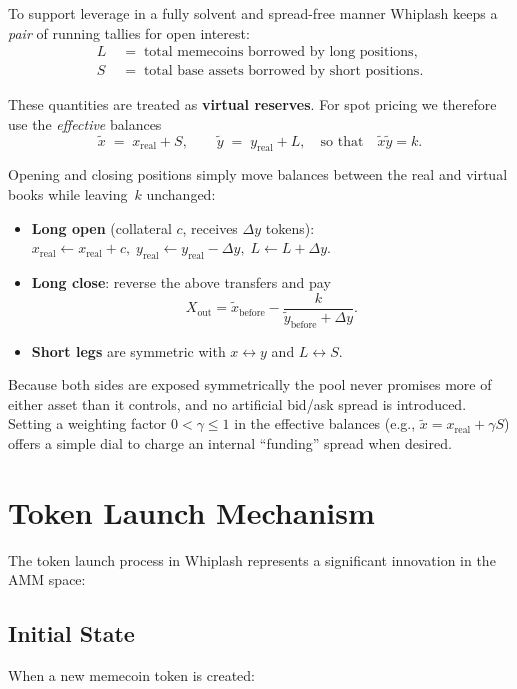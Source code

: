 \documentclass[11pt]{article}
\begin{document}
To support leverage in a fully solvent and spread-free manner Whiplash keeps a \emph{pair} of running tallies for open interest:
\begin{align}
L &\;=\; \text{total memecoins borrowed by long positions},\\
S &\;=\; \text{total base assets borrowed by short positions}.
\end{align}

These quantities are treated as \textbf{virtual reserves}.  For spot pricing we therefore use the \emph{effective} balances
\begin{equation}
\tilde x \;=\; x_{\text{real}} + S, \qquad
\tilde y \;=\; y_{\text{real}} + L ,
\quad\text{so that}\quad
\tilde x \tilde y = k.
\end{equation}

Opening and closing positions simply move balances between the real and virtual books while leaving~$k$ unchanged:
\begin{itemize}
    \item \textbf{Long open} (collateral $c$, receives $\Delta y$ tokens): \\[-1.2ex]
    $x_{\text{real}}\!\leftarrow x_{\text{real}} + c,\;
     y_{\text{real}}\!\leftarrow y_{\text{real}} - \Delta y,\;
     L\!\leftarrow L + \Delta y$.
    \item \textbf{Long close}: reverse the above transfers and pay
    \[ X_{\text{out}} = \tilde x_{\text{before}} - \frac{k}{\tilde y_{\text{before}}+\Delta y}. \]
    \item \textbf{Short legs} are symmetric with $x\leftrightarrow y$ and $L\leftrightarrow S$.
\end{itemize}

Because both sides are exposed symmetrically the pool never promises more of either asset than it controls, and no artificial bid/ask spread is introduced. Setting a weighting factor $0<\gamma\le 1$ in the effective balances (e.g., $\tilde x = x_{\text{real}} + \gamma S$) offers a simple dial to charge an internal ``funding'' spread when desired.

\section{Token Launch Mechanism}

The token launch process in Whiplash represents a significant innovation in the AMM space:

\subsection{Initial State}
When a new memecoin token is created:
\end{document}
